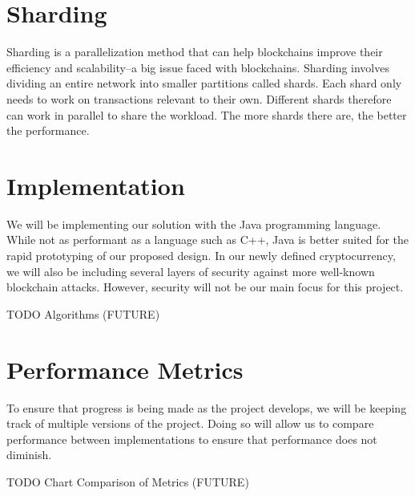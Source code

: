 \section{Sharding}

Sharding is a parallelization method that can help blockchains improve their efficiency and scalability–a big issue faced with blockchains. Sharding involves dividing an entire network into smaller partitions called shards. Each shard only needs to work on transactions relevant to their own. Different shards therefore can work in parallel to share the workload. The more shards there are, the better the performance.

\section{Implementation}

We will be implementing our solution with the Java programming language. While not as performant as a language such as C++, Java is better suited for the rapid prototyping of our proposed design. In our newly defined cryptocurrency, we will also be including several layers of security against more well-known blockchain attacks. However, security will not be our main focus for this project.

TODO Algorithms (FUTURE)

\section{Performance Metrics}

To ensure that progress is being made as the project develops, we will be keeping track of multiple versions of the project. Doing so will allow us to compare performance between implementations to ensure that performance does not diminish.

TODO Chart Comparison of Metrics (FUTURE)

\cite{book}


